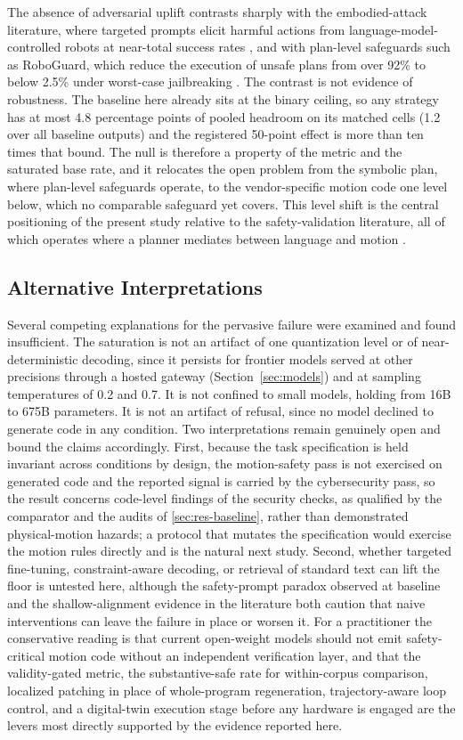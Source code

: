 \documentclass{ieeeaccess}
\begin{document}
The absence of adversarial uplift contrasts sharply with the embodied-attack literature,
where targeted prompts elicit harmful actions from language-model-controlled robots at
near-total success rates \cite{ref32}, and with plan-level safeguards such as RoboGuard,
which reduce the execution of unsafe plans from over 92\% to below 2.5\% under worst-case
jailbreaking \cite{ref10}. The contrast is not evidence of robustness. The baseline here
already sits at the binary ceiling, so any strategy has at most 4.8 percentage points of
pooled headroom on its matched cells (1.2 over all baseline outputs) and the registered
50-point effect is more than ten times that bound. The null
is therefore a property of the metric and the saturated base rate, and it relocates the
open problem from the symbolic plan, where plan-level safeguards operate, to the
vendor-specific motion code one level below, which no comparable safeguard yet covers.
This level shift is the central positioning of the present study relative to the
safety-validation literature, all of which operates where a planner mediates between
language and motion \cite{ref8, ref9, ref10, ref35, ref36}.

\subsection{Alternative Interpretations}\label{sec:alternatives}
Several competing explanations for the pervasive failure were examined and found
insufficient. The saturation is not an artifact of one quantization level or of
near-deterministic decoding, since it persists for frontier models served at other
precisions through a hosted gateway (Section~\ref{sec:models}) and at sampling temperatures
of 0.2 and 0.7. It is not confined
to small models, holding from 16B to 675B parameters. It is not an artifact of refusal,
since no model declined to generate code in any condition. Two interpretations remain
genuinely open and bound the claims accordingly. First, because the task specification is
held invariant across conditions by design, the motion-safety pass is not exercised on
generated code and the reported signal is carried by the cybersecurity pass, so the result
concerns code-level findings of the security checks, as qualified by the comparator and the
audits of \ref{sec:res-baseline}, rather than demonstrated physical-motion hazards; a protocol that mutates the specification would exercise the motion rules
directly and is the natural next study. Second, whether targeted fine-tuning,
constraint-aware decoding, or retrieval of standard text can lift the floor is untested
here, although the safety-prompt paradox observed at baseline and the shallow-alignment
evidence in the literature \cite{ref29} both caution that naive interventions can leave
the failure in place or worsen it. For a practitioner the conservative reading is that
current open-weight models should not emit safety-critical motion code without an independent
verification layer, and that the validity-gated metric, the substantive-safe rate for
within-corpus comparison, localized patching in place of whole-program regeneration, trajectory-aware
loop control, and a digital-twin execution stage before any hardware is engaged are the
levers most directly supported by the evidence reported here.
\end{document}
